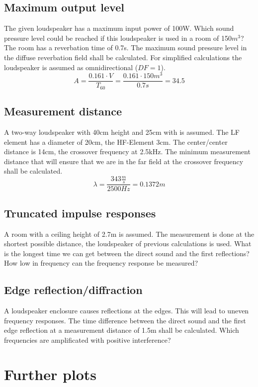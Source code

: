 \documentclass{article}
\begin{document}
\subsection{Maximum output level}
The given loudspeaker has a maximum input power of 100W. Which sound pressure level could be reached if this loudspeaker is used in a room of 150$m^3$? The room has a reverbation time of 0.7s. The maximum sound pressure level in the diffuse reverbation field shall be calculated. For simplified calculations the loudspeaker is assumed as omnidirectional ($DF=1$).\\
$$A=\frac{0.161\cdot V}{T_{60}}=\frac{0.161\cdot 150m^3}{0.7s}=34.5$$
\subsection{Measurement distance}
A two-way loudspeaker with 40cm height and 25cm with is assumed. The LF element has a diameter of 20cm, the HF-Element 3cm. The center/center distance is 14cm, the crossover frequency at 2.5kHz. The minimum measurement distance that will ensure that we are in the far field at the crossover frequency shall be calculated.
$$\lambda=\frac{343\frac{m}{s}}{2500Hz}=0.1372m$$
\subsection{Truncated impulse responses}
A room with a ceiling height of 2.7m is assumed. The measurement is done at the shortest possible distance, the loudspeaker of previous calculations is used. What is the longest time we can get between the direct sound and the first reflections? How low in frequency can the frequency response be measured?
\subsection{Edge reflection/diffraction}
A loudspeaker enclosure causes reflections at the edges. This will lead to uneven frequency responses. The time difference between the direct sound and the first edge reflection at a measurement distance of 1.5m shall be calculated. Which frequencies are amplificated with positive interference?
\section{Further plots}
\end{document}
